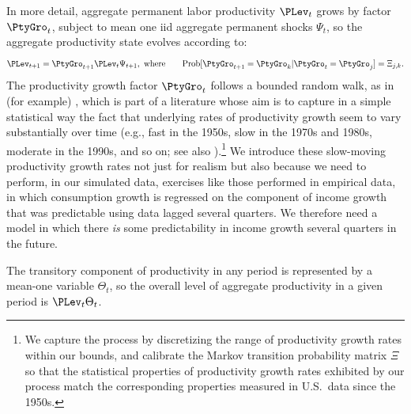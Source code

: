 \documentclass[titlepage]{\econtex}\newcommand{\texname}{cAndCwithStickyE}
\begin{document}
In more detail, aggregate permanent labor productivity $\PLev_t$ grows by factor $\PtyGro_t$, subject to mean one iid aggregate permanent shocks $\Psi_t$, so the aggregate productivity state evolves according to:
\begin{equation}
{\PLev}_{t+1} = \PtyGro_{t+1} {\PLev}_{t}\Psi_{t+1}, \text{ where} \qquad\text{Prob}[\PtyGro_{t+1}=\PtyGro_k | \PtyGro_t = \PtyGro_j] = \Xi_{j,k}.   \label{eq:AggRandWalk}
\end{equation}
The productivity growth factor $\PtyGro_t$ follows a bounded random walk, as in (for example) \cite{edge2007Learning}, which is part of a literature whose aim is to capture in a simple statistical way the fact that underlying rates of productivity growth seem to vary substantially over time (e.g., fast in the 1950s, slow in the 1970s and 1980s, moderate in the 1990s, and so on; see also \cite{jorgenson:ProductivityGrowthResurgence}).\footnote{We capture the process by discretizing the range of productivity growth rates within our bounds, and calibrate the Markov transition probability matrix $\Xi$ so that the statistical properties of productivity growth rates exhibited by our process match the corresponding properties measured in U.S.\ data since the 1950s.}  We introduce these slow-moving productivity growth rates not just for realism but also because we need to perform, in our simulated data, exercises like those \cite{cmModel} performed in empirical data, in which consumption growth is regressed on the component of income growth that was predictable using data lagged several quarters.  We therefore need a model in which there {\it is} some predictability in income growth several quarters in the future.

The transitory component of productivity in any period is represented by a mean-one variable $\Theta_t$, so the overall level of aggregate productivity in a given period is $\PLev_{t}\Theta_{t}$.
\end{document}
